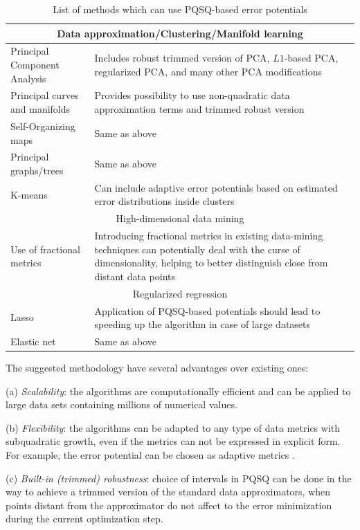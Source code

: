 \documentclass[preprint,12pt,twocolumn]{elsarticle}
\begin{document}
\begin{table}
\begin{tabular*}{\textwidth}{p{6cm}p{7cm}}
\hline
\multicolumn{2}{c}{Data approximation/Clustering/Manifold learning} \\
\hline
Principal Component Analysis &  Includes robust trimmed version of PCA, $L1$-based PCA, regularized PCA, and many other PCA modifications \\
Principal curves and manifolds &  Provides possibility to use non-quadratic data approximation terms and trimmed robust version\\
Self-Organizing maps &  Same as above \\
Principal graphs/trees &  Same as above \\
K-means & Can include adaptive error potentials based on estimated error distributions inside clusters \\
\hline
\multicolumn{2}{c}{High-dimensional data mining} \\
\hline
Use of fractional metrics & Introducing fractional metrics in existing data-mining techniques can potentially deal with the curse of dimensionality, helping to better distinguish close from distant data points \cite{Aggarwal2001} \\
\hline
\multicolumn{2}{c}{Regularized regression} \\
\hline
Lasso & Application of PQSQ-based potentials should lead to speeding up the algorithm in case of large datasets \\
Elastic net & Same as above \\
\hline
\end{tabular*}
\caption{List of methods which can use PQSQ-based error potentials}\label{ApplicationTable}
\end{table}


The suggested methodology have several advantages over existing ones:

(a) \textit{Scalability}: the algorithms are computationally efficient and can be applied to large data sets containing millions of numerical values.

(b) \textit{Flexibility}: the algorithms can be adapted to any type of data metrics with subquadratic growth, even if the metrics can not be expressed in explicit form. For example, the error potential can be chosen as adaptive metrics \cite{Yang2006, Wu2009}.

(c) \textit{Built-in (trimmed) robustness}: choice of intervals in PQSQ can be done in the way to achieve a trimmed version of the standard data approximators, when points distant from the approximator do not affect to the error minimization during the current optimization step.
\end{document}
